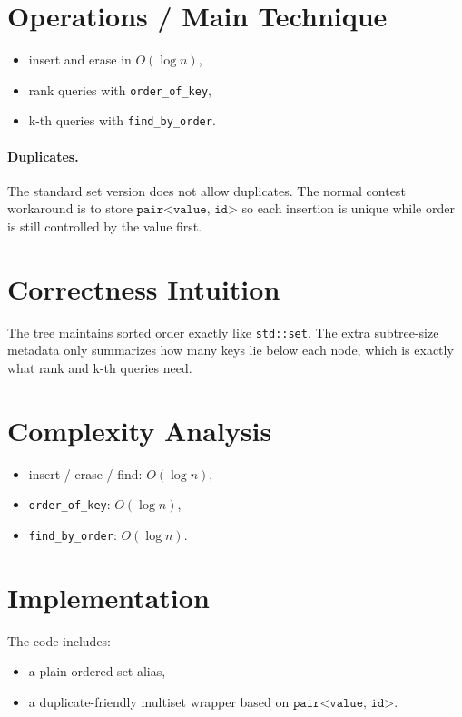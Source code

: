 \section*{Operations / Main Technique}

\begin{itemize}
  \item insert and erase in \(O(\log n)\),
  \item rank queries with \texttt{order\_of\_key},
  \item k-th queries with \texttt{find\_by\_order}.
\end{itemize}

\paragraph{Duplicates.}
The standard set version does not allow duplicates. The normal contest workaround is to store
\(\texttt{pair<value, id>}\) so each insertion is unique while order is still controlled by the value first.

\section*{Correctness Intuition}

The tree maintains sorted order exactly like \texttt{std::set}. The extra subtree-size metadata only summarizes how
many keys lie below each node, which is exactly what rank and k-th queries need.

\section*{Complexity Analysis}

\begin{itemize}
  \item insert / erase / find: \(O(\log n)\),
  \item \texttt{order\_of\_key}: \(O(\log n)\),
  \item \texttt{find\_by\_order}: \(O(\log n)\).
\end{itemize}

\section*{Implementation}

The code includes:

\begin{itemize}
  \item a plain ordered set alias,
  \item a duplicate-friendly multiset wrapper based on \(\texttt{pair<value, id>}\).
\end{itemize}


